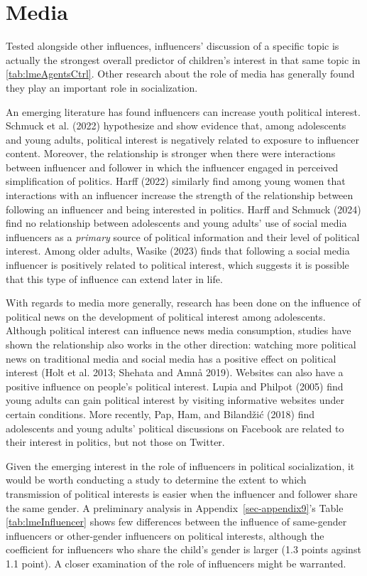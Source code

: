 \documentclass[
  letterpaper,
  DIV=11,
  numbers=noendperiod]{scrreprt}
\begin{document}
\section{Media}\label{media}

Tested alongside other influences, influencers' discussion of a specific
topic is actually the strongest overall predictor of children's interest
in that same topic in \ref{tab:lmeAgentsCtrl}. Other research about the
role of media has generally found they play an important role in
socialization.

An emerging literature has found influencers can increase youth
political interest. Schmuck et al. (2022) hypothesize and show evidence
that, among adolescents and young adults, political interest is
negatively related to exposure to influencer content. Moreover, the
relationship is stronger when there were interactions between influencer
and follower in which the influencer engaged in perceived simplification
of politics. Harff (2022) similarly find among young women that
interactions with an influencer increase the strength of the
relationship between following an influencer and being interested in
politics. Harff and Schmuck (2024) find no relationship between
adolescents and young adults' use of social media influencers as a
\emph{primary} source of political information and their level of
political interest. Among older adults, Wasike (2023) finds that
following a social media influencer is positively related to political
interest, which suggests it is possible that this type of influence can
extend later in life.

With regards to media more generally, research has been done on the
influence of political news on the development of political interest
among adolescents. Although political interest can influence news media
consumption, studies have shown the relationship also works in the other
direction: watching more political news on traditional media and social
media has a positive effect on political interest (Holt et al. 2013;
Shehata and Amnå 2019). Websites can also have a positive influence on
people's political interest. Lupia and Philpot (2005) find young adults
can gain political interest by visiting informative websites under
certain conditions. More recently, Pap, Ham, and Bilandžić (2018) find
adolescents and young adults' political discussions on Facebook are
related to their interest in politics, but not those on Twitter.

Given the emerging interest in the role of influencers in political
socialization, it would be worth conducting a study to determine the
extent to which transmission of political interests is easier when the
influencer and follower share the same gender. A preliminary analysis in
Appendix~\ref{sec-appendix9}'s Table \ref{tab:lmeInfluencer} shows few
differences between the influence of same-gender influencers or
other-gender influencers on political interests, although the
coefficient for influencers who share the child's gender is larger (1.3
points agsinst 1.1 point). A closer examination of the role of
influencers might be warranted.
\end{document}
